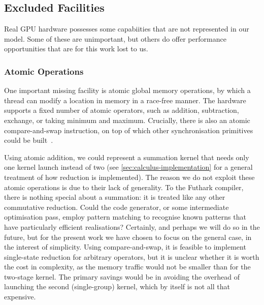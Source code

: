 \subsection{Excluded Facilities}

Real GPU hardware possesses some capabiities that are not represented
in our model.  Some of these are unimportant, but others do offer
performance opportunities that are for this work lost to us.

\subsubsection{Atomic Operations}

One important missing facility is atomic global memory operations, by
which a thread can modify a location in memory in a race-free manner.
The hardware supports a fixed number of atomic operators, such as
addition, subtraction, exchange, or taking minimum and maximum.
Crucially, there is also an atomic compare-and-swap instruction, on
top of which other synchronisation primitives could be
built~\cite{fraser2004practical}.

Using atomic addition, we could represent a summation kernel that
needs only one kernel launch instead of two (see
\cref{sec:calculus-implementation} for a general treatment of how
reduction is implemented).  The reason we do not exploit these atomic
operations is due to their lack of generality.  To the Futhark
compiler, there is nothing special about a summation: it is treated
like any other commutative reduction.  Could the code generator, or
some intermediate optimisation pass, employ pattern matching to
recognise known patterns that have particularly efficient
realisations?  Certainly, and perhaps we will do so in the future, but
for the present work we have chosen to focus on the general case, in
the interest of simplicity.  Using compare-and-swap, it is feasible to
implement single-state reduction for arbitrary operators, but it is
unclear whether it is worth the cost in complexity, as the memory
traffic would not be smaller than for the two-stage kernel.  The
primary savings would be in avoiding the overhead of launching the
second (single-group) kernel, which by itself is not all that
expensive.

